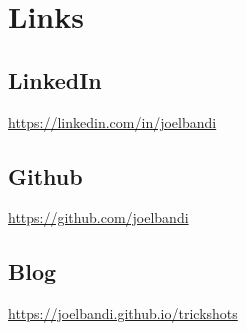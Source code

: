 \section{Links}
  \subsection{LinkedIn}
  \url{https://linkedin.com/in/joelbandi}\\
  \subsection{Github}
  \url{https://github.com/joelbandi}\\
  \subsection{Blog}
  \url{https://joelbandi.github.io/trickshots}\\
